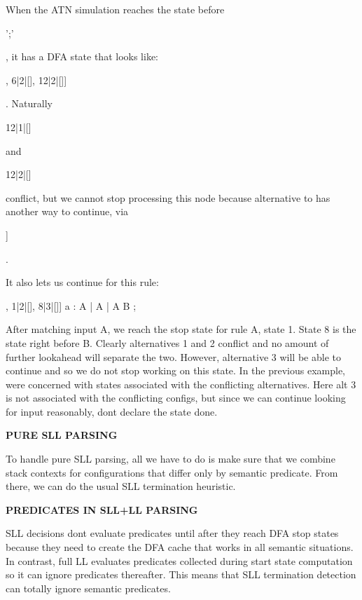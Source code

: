 When the A\+TN simulation reaches the state before
\begin{DoxyCode}
\textcolor{charliteral}{';'} 
\end{DoxyCode}
 , it has a D\+FA state that looks like\+:
\begin{DoxyCode}
[12|1|[], 6|2|[], 12|2|[]] 
\end{DoxyCode}
 . Naturally 
\begin{DoxyCode}
12|1|[] 
\end{DoxyCode}
 and
\begin{DoxyCode}
12|2|[] 
\end{DoxyCode}
 conflict, but we cannot stop processing this node because alternative to has another way to continue, via
\begin{DoxyCode}
[6|2|[]] 
\end{DoxyCode}
 .

It also let\textquotesingle{}s us continue for this rule\+:


\begin{DoxyCode}
[1|1|[], 1|2|[], 8|3|[]] a : A | A | A B ; 
\end{DoxyCode}
 

After matching input A, we reach the stop state for rule A, state 1. State 8 is the state right before B. Clearly alternatives 1 and 2 conflict and no amount of further lookahead will separate the two. However, alternative 3 will be able to continue and so we do not stop working on this state. In the previous example, we\textquotesingle{}re concerned with states associated with the conflicting alternatives. Here alt 3 is not associated with the conflicting configs, but since we can continue looking for input reasonably, don\textquotesingle{}t declare the state done.

{\bfseries P\+U\+RE S\+LL P\+A\+R\+S\+I\+NG}

To handle pure S\+LL parsing, all we have to do is make sure that we combine stack contexts for configurations that differ only by semantic predicate. From there, we can do the usual S\+LL termination heuristic.

{\bfseries P\+R\+E\+D\+I\+C\+A\+T\+ES IN S\+L\+L+\+LL P\+A\+R\+S\+I\+NG}

S\+LL decisions don\textquotesingle{}t evaluate predicates until after they reach D\+FA stop states because they need to create the D\+FA cache that works in all semantic situations. In contrast, full LL evaluates predicates collected during start state computation so it can ignore predicates thereafter. This means that S\+LL termination detection can totally ignore semantic predicates.

